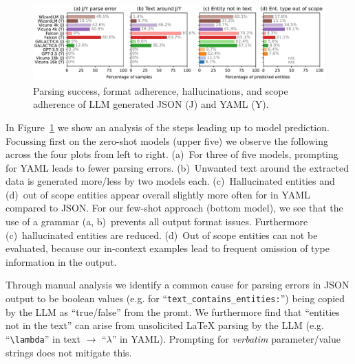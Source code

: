 
\begin{figure}[tb]
  \centering
  \includegraphics[width=\linewidth]{figures/ref_params/format_eval_mix}
  \caption[Parsing success, format adherence, hallucinations, and scope adherence of LLM generated JSON and YAML]{Parsing success, format adherence, hallucinations, and scope adherence of LLM generated JSON (J) and YAML (Y).}
  \label{fig:yamlVSjson}
\end{figure}

In Figure~\ref{fig:yamlVSjson} we show an analysis of the steps leading up to model prediction. Focussing first on the zero-shot models (upper five) we observe the following across the four plots from left to right. (a)~For three of five models, prompting for YAML leads to fewer parsing errors. (b)~Unwanted text around the extracted data is generated more/less by two models each. (c)~Hallucinated entities and (d)~out of scope entities appear overall slightly more often for in YAML compared to JSON. For our few-shot approach (bottom model), we see that the use of a grammar (a, b)~prevents all output format issues. Furthermore (c)~hallucinated entities are reduced. (d)~Out of scope entities can not be evaluated, because our in-context examples lead to frequent omission of type information in the output.

Through manual analysis we identify a common cause for parsing errors in JSON output to be boolean values (e.g. for ``\texttt{text\_\allowbreak contains\_\allowbreak entities:}'') being copied by the LLM as ``true/false'' from the promt. We furthermore find that ``entities not in the text'' can arise from unsolicited \LaTeX{} parsing by the LLM (e.g. ``\verb|\lambda|'' in text $\rightarrow$ ``$\lambda$'' in YAML). Prompting for \emph{verbatim} parameter/value strings does not mitigate this.

